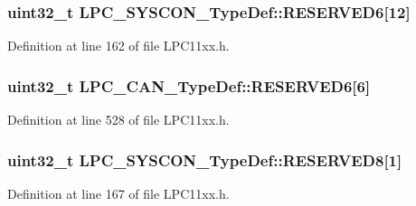 \subsubsection[{\texorpdfstring{R\+E\+S\+E\+R\+V\+E\+D6}{RESERVED6}}]{\setlength{\rightskip}{0pt plus 5cm}uint32\+\_\+t L\+P\+C\+\_\+\+S\+Y\+S\+C\+O\+N\+\_\+\+Type\+Def\+::\+R\+E\+S\+E\+R\+V\+E\+D6\mbox{[}12\mbox{]}}\hypertarget{group___l_p_c11xx___definitions_ga57f21d812bc385b1452e4b634910dc96}{}\label{group___l_p_c11xx___definitions_ga57f21d812bc385b1452e4b634910dc96}


Definition at line 162 of file L\+P\+C11xx.\+h.

\subsubsection[{\texorpdfstring{R\+E\+S\+E\+R\+V\+E\+D6}{RESERVED6}}]{\setlength{\rightskip}{0pt plus 5cm}uint32\+\_\+t L\+P\+C\+\_\+\+C\+A\+N\+\_\+\+Type\+Def\+::\+R\+E\+S\+E\+R\+V\+E\+D6\mbox{[}6\mbox{]}}\hypertarget{group___l_p_c11xx___definitions_gac9d8872ef23421105e28b5c87ebcbbc4}{}\label{group___l_p_c11xx___definitions_gac9d8872ef23421105e28b5c87ebcbbc4}


Definition at line 528 of file L\+P\+C11xx.\+h.

\subsubsection[{\texorpdfstring{R\+E\+S\+E\+R\+V\+E\+D8}{RESERVED8}}]{\setlength{\rightskip}{0pt plus 5cm}uint32\+\_\+t L\+P\+C\+\_\+\+S\+Y\+S\+C\+O\+N\+\_\+\+Type\+Def\+::\+R\+E\+S\+E\+R\+V\+E\+D8\mbox{[}1\mbox{]}}\hypertarget{group___l_p_c11xx___definitions_ga03a77dbffb206de6e41e18c6bc3b4895}{}\label{group___l_p_c11xx___definitions_ga03a77dbffb206de6e41e18c6bc3b4895}


Definition at line 167 of file L\+P\+C11xx.\+h.

